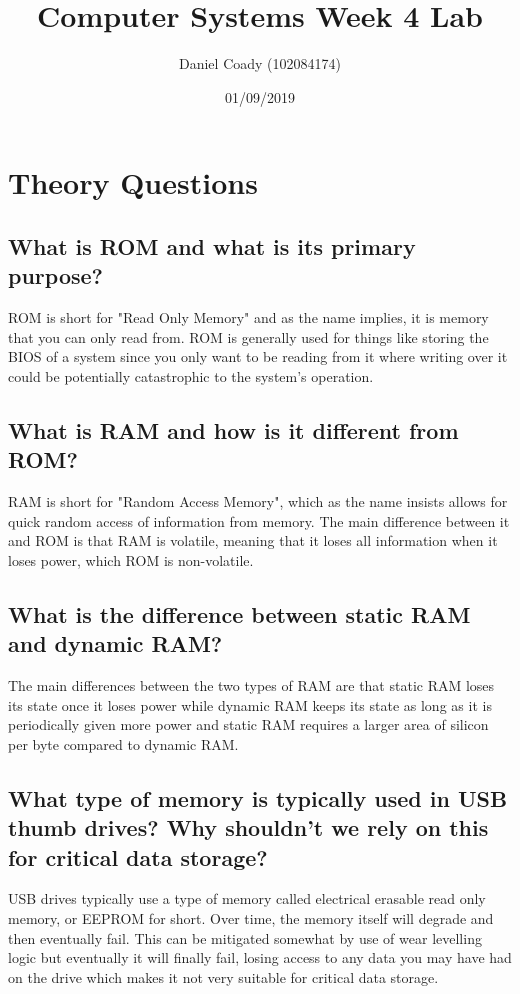 \documentclass[11pt]{scrartcl}
\title{Computer Systems Week 4 Lab}
\author{Daniel Coady (102084174)}
\date{01/09/2019}
\begin{document}
\maketitle

\section*{Theory Questions}

\subsection*{What is ROM and what is its primary purpose?}
ROM is short for "Read Only Memory" and as the name implies, it is memory that you
can only read from. ROM is generally used for things like storing the BIOS of a 
system since you only want to be reading from it where writing over it could be
potentially catastrophic to the system's operation.

\subsection*{What is RAM and how is it different from ROM?}
RAM is short for "Random Access Memory", which as the name insists allows for
quick random access of information from memory. The main difference between it
and ROM is that RAM is volatile, meaning that it loses all information when it
loses power, which ROM is non-volatile.

\subsection*{What is the difference between static RAM and dynamic RAM?}
The main differences between the two types of RAM are that static RAM loses its
state once it loses power while dynamic RAM keeps its state as long as it is
periodically given more power and static RAM requires a larger area of silicon
per byte compared to dynamic RAM.

\subsection*{What type of memory is typically used in USB thumb drives? Why
             shouldn't we rely on this for critical data storage?}
USB drives typically use a type of memory called electrical erasable read only
memory, or EEPROM for short. Over time, the memory itself will degrade and then
eventually fail. This can be mitigated somewhat by use of wear levelling logic
but eventually it will finally fail, losing access to any data you may have had on
the drive which makes it not very suitable for critical data storage.
\end{document}
